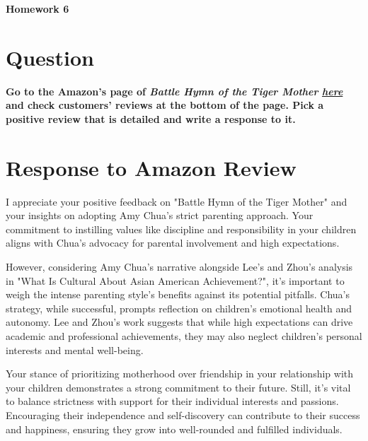 \documentclass[12pt]{article}
\begin{document}
\begin{center}
  \Large \textbf{Homework 6}
\end{center}

\section*{Question}
\textbf{Go to the Amazon's page of \textit{Battle Hymn of the Tiger Mother} \textit{\href{https://www.amazon.com/gp/customer-reviews/R287G01Z74I9Q5/ref=cm_cr_arp_d_rvw_ttl?ie=UTF8&ASIN=0143120581}{here}} and check customers' reviews at the bottom of the page. Pick a positive review that is detailed and write a response to it.}

\section*{Response to Amazon Review}
I appreciate your positive feedback on "Battle Hymn of the Tiger Mother" and your insights on adopting Amy Chua's strict parenting approach. Your commitment to instilling values like discipline and responsibility in your children aligns with Chua's advocacy for parental involvement and high expectations.

However, considering Amy Chua's narrative alongside Lee's and Zhou's analysis in "What Is Cultural About Asian American Achievement?", it's important to weigh the intense parenting style's benefits against its potential pitfalls. Chua's strategy, while successful, prompts reflection on children's emotional health and autonomy. Lee and Zhou's work suggests that while high expectations can drive academic and professional achievements, they may also neglect children's personal interests and mental well-being.

Your stance of prioritizing motherhood over friendship in your relationship with your children demonstrates a strong commitment to their future. Still, it's vital to balance strictness with support for their individual interests and passions. Encouraging their independence and self-discovery can contribute to their success and happiness, ensuring they grow into well-rounded and fulfilled individuals.
\end{document}
